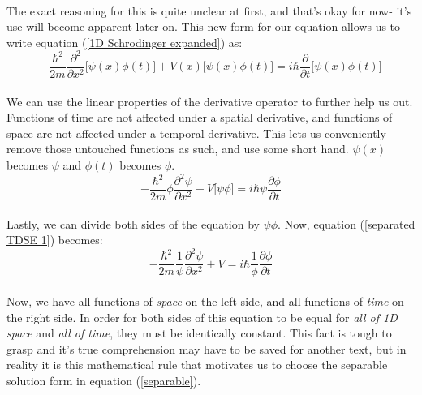 \documentclass[12pt,letterpaper]{book}
\begin{document}
\paragraph*{}The exact reasoning for this is quite unclear at first, and that's okay for now- it's use will become apparent later on. This new form for our equation allows us to write equation (\ref{1D Schrodinger expanded}) as:
\begin{equation}
\label{separated TDSE 0}
-\frac{\hbar^2}{2m}\frac{\partial^2}{\partial x^2}\Big[ \psi(x)\phi(t) \Big] +
V(x)\Big[ \psi(x)\phi(t) \Big] = i\hbar\frac{\partial}{\partial t}\Big[ \psi(x)\phi(t) \Big]
\end{equation}
\paragraph*{}We can use the linear properties of the derivative operator to further help us out. Functions of time are not affected under a spatial derivative, and functions of space are not affected under a temporal derivative. This lets us conveniently remove those untouched functions as such, and use some short hand. $\psi(x)$ becomes $\psi$ and $\phi(t)$ becomes $\phi$.
\begin{equation}
\label{separated TDSE 1}
-\frac{\hbar^2}{2m}\phi\frac{\partial^2\psi}{\partial x^2} +
V\big[ \psi\phi \big] = 
i\hbar\psi\frac{\partial \phi}{\partial t}
\end{equation}
\paragraph*{}Lastly, we can divide both sides of the equation by $\psi \phi$. Now, equation (\ref{separated TDSE 1}) becomes:
\begin{equation}
\label{separated TDSE 2}
-\frac{\hbar^2}{2m}\frac{1}{\psi}\frac{\partial^2\psi}{\partial x^2} + V = 
i\hbar \frac{1}{\phi}\frac{\partial \phi}{\partial t}
\end{equation}
\paragraph*{}Now, we have all functions of \textit{space} on the left side, and all functions of \textit{time} on the right side. In order for both sides of this equation to be equal for \textit{all of 1D space} and \textit{all of time}, they must be identically constant. This fact is tough to grasp and it's true comprehension may have to be saved for another text, but in reality it is this mathematical rule that motivates us to choose the separable solution form in equation (\ref{separable}).
\end{document}
